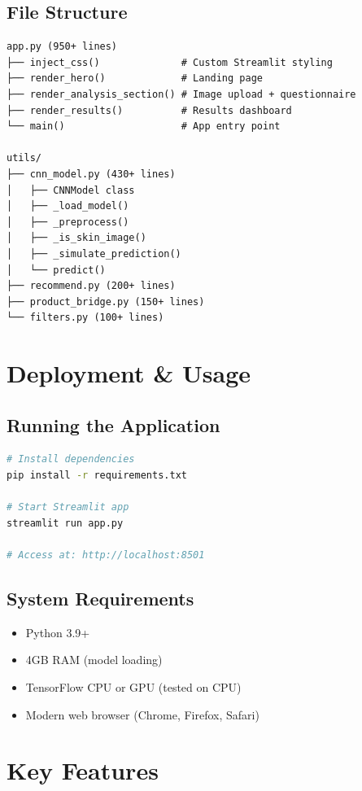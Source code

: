 \documentclass[12pt,a4paper]{article}
\begin{document}
\subsection{File Structure}

\begin{lstlisting}
app.py (950+ lines)
├── inject_css()              # Custom Streamlit styling
├── render_hero()             # Landing page
├── render_analysis_section() # Image upload + questionnaire
├── render_results()          # Results dashboard
└── main()                    # App entry point

utils/
├── cnn_model.py (430+ lines)
│   ├── CNNModel class
│   ├── _load_model()
│   ├── _preprocess()
│   ├── _is_skin_image()
│   ├── _simulate_prediction()
│   └── predict()
├── recommend.py (200+ lines)
├── product_bridge.py (150+ lines)
└── filters.py (100+ lines)
\end{lstlisting}

\section{Deployment \& Usage}

\subsection{Running the Application}

\begin{lstlisting}[language=bash]
# Install dependencies
pip install -r requirements.txt

# Start Streamlit app
streamlit run app.py

# Access at: http://localhost:8501
\end{lstlisting}

\subsection{System Requirements}

\begin{itemize}
    \item Python 3.9+
    \item 4GB RAM (model loading)
    \item TensorFlow CPU or GPU (tested on CPU)
    \item Modern web browser (Chrome, Firefox, Safari)
\end{itemize}

\section{Key Features}
\end{document}
